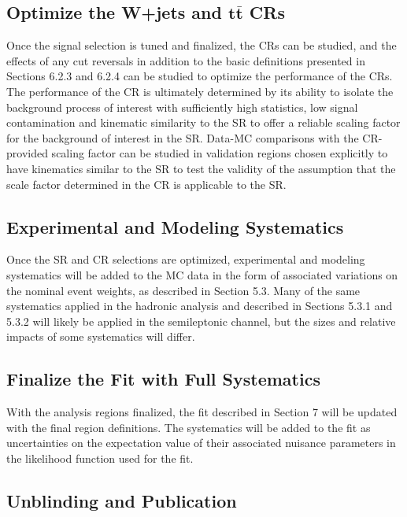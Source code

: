 \documentclass[12pt]{article}
\begin{document}
\subsection{Optimize the W+jets and $\bm{t\bar{t}}$ CRs}

Once the signal selection is tuned and finalized, the CRs can be studied, and the effects of any cut reversals in addition to the basic definitions presented in Sections 6.2.3 and 6.2.4 can be studied to optimize the performance of the CRs. The performance of the CR is ultimately determined by its ability to isolate the background process of interest with sufficiently high statistics, low signal contamination and kinematic similarity to the SR to offer a reliable scaling factor for the background of interest in the SR. Data-MC comparisons with the CR-provided scaling factor can be studied in validation regions chosen explicitly to have kinematics similar to the SR to test the validity of the assumption that the scale factor determined in the CR is applicable to the SR. 

\subsection{Experimental and Modeling Systematics}

Once the SR and CR selections are optimized, experimental and modeling systematics will be added to the MC data in the form of associated variations on the nominal event weights, as described in Section 5.3. Many of the same systematics applied in the hadronic analysis and described in Sections 5.3.1 and 5.3.2 will likely be applied in the semileptonic channel, but the sizes and relative impacts of some systematics will differ. 

\subsection{Finalize the Fit with Full Systematics}

With the analysis regions finalized, the fit described in Section 7 will be updated with the final region definitions. The systematics will be added to the fit as uncertainties on the expectation value of their associated nuisance parameters in the likelihood function \cite{Baak:2014wma} used for the fit. 

\subsection{Unblinding and Publication}
\end{document}
